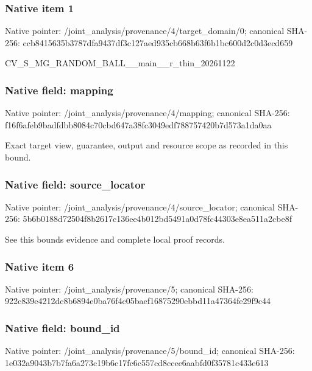 \documentclass[10pt,a4paper]{article}
\begin{document}
\subsubsection{Native item 1}


Native pointer: /joint\_analysis/provenan\allowbreak{}ce/4/target\_domain/0; canonical SHA-256: ccb8415635b3787dfa9437df\allowbreak{}3c127aed935cb668b63f6b1b\allowbreak{}c600d2c0d3ecd659


CV\_S\_MG\_RANDOM\_BALL\_\_mai\allowbreak{}n\_\_r\_thin\_20261122


\subsubsection{Native field: mapping}


Native pointer: /joint\_analysis/provenance/4/mapping; canonical SHA-256: f16f6afeb9badfdbb8084c70\allowbreak{}cbd647a38fc3049edf788757\allowbreak{}420b7d573a1da0aa


Exact target view, guarantee, output and resource scope as recorded in this bound.


\subsubsection{Native field: source\_locator}


Native pointer: /joint\_analysis/provenan\allowbreak{}ce/4/source\_locator; canonical SHA-256: 5b6b0188d72504f8b2617c13\allowbreak{}6ee4b012bd5491a0d78fc443\allowbreak{}03e8ea511a2cbe8f


See this bounds evidence and complete local proof records.


\subsubsection{Native item 6}


Native pointer: /joint\_analysis/provenance/5; canonical SHA-256: 922c839e4212dc8b6894e0ba\allowbreak{}76f4c05baef16875290ebbd1\allowbreak{}1a47364fe29f9c44



\subsubsection{Native field: bound\_id}


Native pointer: /joint\_analysis/provenance/5/bound\_id; canonical SHA-256: 1e032a9043b7b7fa6a273c19\allowbreak{}b6c17fc6c557cd8ccee6aabf\allowbreak{}d0f35781c433e613
\end{document}
